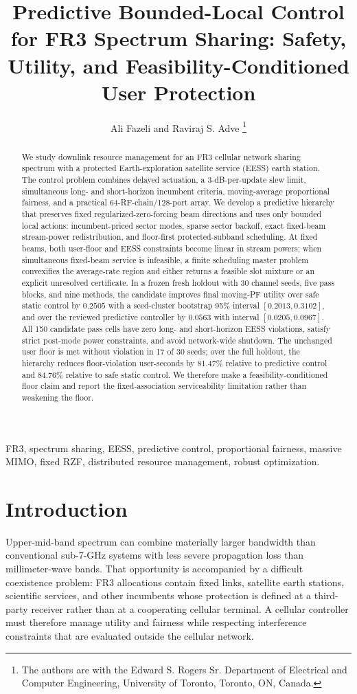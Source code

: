 \documentclass[journal]{IEEEtran}
\title{Predictive Bounded-Local Control for FR3 Spectrum Sharing: Safety, Utility, and Feasibility-Conditioned User Protection}
\author{Ali Fazeli and Raviraj S. Adve%
\thanks{The authors are with the Edward S. Rogers Sr. Department of Electrical and Computer Engineering, University of Toronto, Toronto, ON, Canada.}}
\begin{document}
\maketitle

\begin{abstract}
We study downlink resource management for an FR3 cellular network sharing spectrum with a protected Earth-exploration satellite service (EESS) earth station. The control problem combines delayed actuation, a 3-dB-per-update slew limit, simultaneous long- and short-horizon incumbent criteria, moving-average proportional fairness, and a practical 64-RF-chain/128-port array. We develop a predictive hierarchy that preserves fixed regularized-zero-forcing beam directions and uses only bounded local actions: incumbent-priced sector modes, sparse sector backoff, exact fixed-beam stream-power redistribution, and floor-first protected-subband scheduling. At fixed beams, both user-floor and EESS constraints become linear in stream powers; when simultaneous fixed-beam service is infeasible, a finite scheduling master problem convexifies the average-rate region and either returns a feasible slot mixture or an explicit unresolved certificate. In a frozen fresh holdout with 30 channel seeds, five pass blocks, and nine methods, the candidate improves final moving-PF utility over safe static control by $0.2505$ with a seed-cluster bootstrap 95\% interval $[0.2013,0.3102]$, and over the reviewed predictive controller by $0.0563$ with interval $[0.0205,0.0967]$. All 150 candidate pass cells have zero long- and short-horizon EESS violations, satisfy strict post-mode power constraints, and avoid network-wide shutdown. The unchanged user floor is met without violation in 17 of 30 seeds; over the full holdout, the hierarchy reduces floor-violation user-seconds by 81.47\% relative to predictive control and 84.76\% relative to safe static control. We therefore make a feasibility-conditioned floor claim and report the fixed-association serviceability limitation rather than weakening the floor.
\end{abstract}

\begin{IEEEkeywords}
FR3, spectrum sharing, EESS, predictive control, proportional fairness, massive MIMO, fixed RZF, distributed resource management, robust optimization.
\end{IEEEkeywords}

\section{Introduction}
Upper-mid-band spectrum can combine materially larger bandwidth than conventional sub-7-GHz systems with less severe propagation loss than millimeter-wave bands. That opportunity is accompanied by a difficult coexistence problem: FR3 allocations contain fixed links, satellite earth stations, scientific services, and other incumbents whose protection is defined at a third-party receiver rather than at a cooperating cellular terminal. A cellular controller must therefore manage utility and fairness while respecting interference constraints that are evaluated outside the cellular network.
\end{document}

